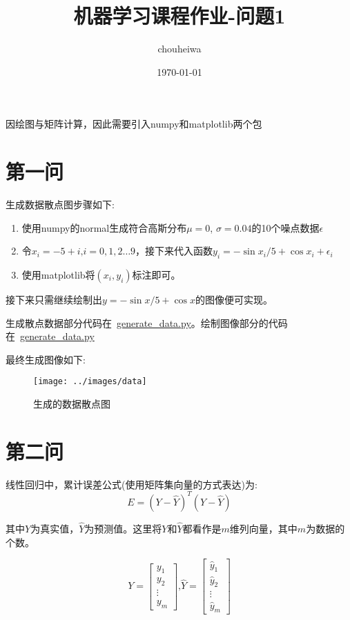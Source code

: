 \documentclass[UTF8]{article} %
\title{机器学习课程作业-问题1}
\author{chouheiwa}
\date{\today}
\begin{document}
    \maketitle
    \tableofcontents
    因绘图与矩阵计算，因此需要引入numpy和matplotlib两个包


    \section{第一问}
    生成数据散点图步骤如下:
    \begin{enumerate}
        \item 使用numpy的normal生成符合高斯分布$\mu = 0$, $\sigma = 0.04$的10个噪点数据$\epsilon$
        \item 令$x_i = -5 + i\text{,} i = 0, 1, 2 \dots 9$，接下来代入函数$y_i = -\sin{x_i / 5} + \cos{x_i} + \epsilon_i$
        \item 使用matplotlib将$(x_i, y_i)$标注即可。
    \end{enumerate}

    接下来只需继续绘制出$y = -\sin{x / 5} + \cos{x}$的图像便可实现。

    生成散点数据部分代码在~\href{run:generate_data.py}{generate\_data.py}。绘制图像部分的代码在~\href{run:generate_data.py}{generate\_data.py}

    最终生成图像如下:

    \begin{figure}[H]
        \centering
        \texttt{[image: ../images/data]}
        \caption{生成的数据散点图}
        \label{fig:data}
    \end{figure}


    \section{第二问}
    线性回归中，累计误差公式(使用矩阵集向量的方式表达)为:
    \begin{equation}
        E = (Y - \hat{Y})^T(Y - \hat{Y})
        \label{eq:E}
    \end{equation}

    其中$Y$为真实值，$\hat{Y}$为预测值。这里将$Y$和$\hat{Y}$都看作是$m$维列向量，其中$m$为数据的个数。

    \begin{equation}
        Y = \begin{bmatrix}
                y_1    \\
                y_2    \\
                \vdots \\
                y_m
        \end{bmatrix} \text{,}
        \hat{Y} = \begin{bmatrix}
                      \hat{y}_1 \\
                      \hat{y}_2 \\
                      \vdots    \\
                      \hat{y}_m
        \end{bmatrix}\label{eq:Y}
    \end{equation}
\end{document}
